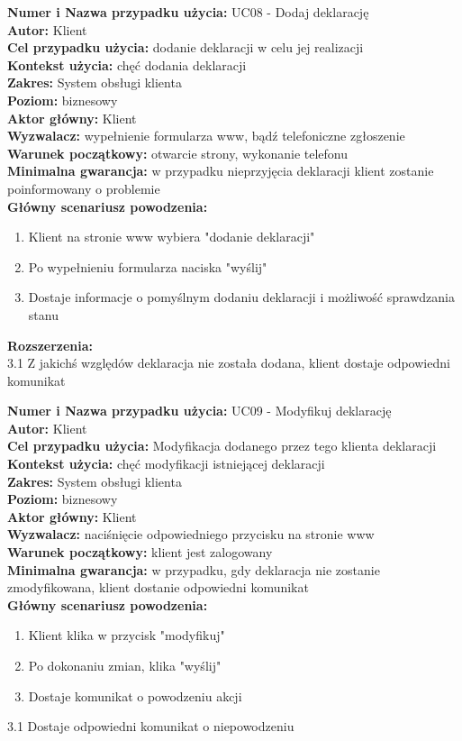 \textbf{Numer i Nazwa przypadku użycia:} UC08 - Dodaj deklarację \\
\textbf{Autor:} Klient \\
\textbf{Cel przypadku użycia:} dodanie deklaracji w celu jej realizacji \\
\textbf{Kontekst użycia:} chęć dodania deklaracji \\
\textbf{Zakres:} System obsługi klienta \\
\textbf{Poziom:} biznesowy \\
\textbf{Aktor główny:} Klient \\
\textbf{Wyzwalacz:} wypełnienie formularza www, bądź telefoniczne zgłoszenie \\
\textbf{Warunek początkowy:} otwarcie strony, wykonanie telefonu \\
\textbf{Minimalna gwarancja:} w przypadku nieprzyjęcia deklaracji klient zostanie poinformowany o problemie \\
\textbf{Główny scenariusz powodzenia:} \\
	\begin{enumerate}
		\item Klient na stronie www wybiera "dodanie deklaracji"
		\item Po wypełnieniu formularza naciska "wyślij"
		\item Dostaje informacje o pomyślnym dodaniu deklaracji i możliwość sprawdzania stanu
	\end{enumerate}
\textbf{Rozszerzenia:} \\
	3.1 Z jakichś względów deklaracja nie została dodana, klient dostaje odpowiedni komunikat

\textbf{Numer i Nazwa przypadku użycia:} UC09 - Modyfikuj deklarację \\
\textbf{Autor:} Klient\\
\textbf{Cel przypadku użycia:} Modyfikacja dodanego przez tego klienta deklaracji \\
\textbf{Kontekst użycia:} chęć modyfikacji istniejącej deklaracji\\
\textbf{Zakres:} System obsługi klienta \\
\textbf{Poziom:} biznesowy \\
\textbf{Aktor główny:} Klient\\
\textbf{Wyzwalacz:} naciśnięcie odpowiedniego przycisku na stronie www \\
\textbf{Warunek początkowy:} klient jest zalogowany\\
\textbf{Minimalna gwarancja:} w przypadku, gdy deklaracja nie zostanie zmodyfikowana, klient dostanie odpowiedni komunikat \\
\textbf{Główny scenariusz powodzenia:} \\
	\begin{enumerate}
		\item Klient klika w przycisk "modyfikuj"
		\item Po dokonaniu zmian, klika "wyślij"
		\item Dostaje komunikat o powodzeniu akcji
	\end{enumerate}
		3.1 Dostaje odpowiedni komunikat o niepowodzeniu
		
